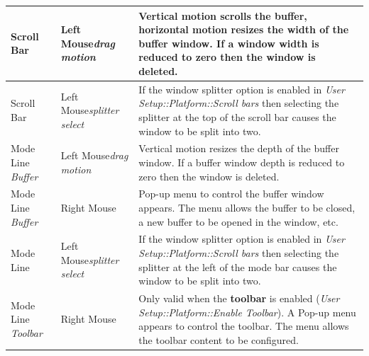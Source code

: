\documentclass[11pt,a4paper,pdftex]{article}
\begin{document}
\begin{center}
\begin{small}
\begin{longtable}{|p{}|p{}|p{}|}
        Scroll Bar & Left Mouse\newline \textit{drag motion} &

        Vertical motion scrolls the buffer, horizontal motion resizes the
        width of the buffer window. If a window width is reduced to zero then
        the window is deleted.\\ \hline

        Scroll Bar & Left Mouse\newline \textit{splitter select} &

        If the window splitter option is enabled in \textit{User
        Setup::\-Platform::\-Scroll bars} then selecting the splitter at the
        top of the scroll bar causes the window to be split into two.\\ \hline

        Mode Line \newline \textit{Buffer} &
        Left Mouse\newline \textit{drag motion} &

        Vertical motion resizes the depth of the buffer window. If a buffer
        window depth is reduced to zero then the window is deleted.\\ \hline

        Mode Line \newline \textit{Buffer} & Right Mouse &

        Pop-up menu to control the buffer window appears. The menu allows the
        buffer to be closed, a new buffer to be opened in the window, etc.\\
        \hline

        Mode Line & Left Mouse\newline \textit{splitter select} &

        If the window splitter option is enabled in \textit{User
        Setup::\-Platform::\-Scroll bars} then selecting the splitter at the
        left of the mode bar causes the window to be split into two.\\ \hline

        Mode Line \newline \textit{Toolbar} & Right Mouse &

        Only valid when the \textbf{toolbar} is enabled (\textit{User
        Setup::\-Platform::\-Enable Toolbar}). A Pop-up menu appears to
        control the toolbar. The menu allows the toolbar content to be
        configured.\\

      \end{longtable}
    \end{small}
  \end{center}
\end{document}
